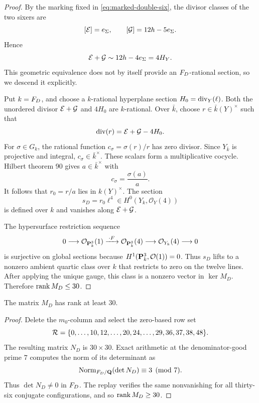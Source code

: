 \begin{proof}
By the marking fixed in \cref{eq:marked-double-six}, the divisor classes of
the two sixers are
\[
 [\mathcal E]=e_\Sigma,\qquad [\mathcal G]=12h-5e_\Sigma.
\]
Hence
\begin{equation}
 \mathcal E+\mathcal G\sim12h-4e_\Sigma=4H_Y.
\label{eq:double-six-class}
\end{equation}
This geometric equivalence does not by itself provide an \(F_D\)-rational
section, so we descend it explicitly.

Put \(k=F_D\), and choose a \(k\)-rational hyperplane section
\(H_0=\operatorname{div}_Y(\ell)\).  Both the unordered divisor \(\mathcal E+\mathcal G\) and \(4H_0\)
are \(k\)-rational.  Over \(\bar k\), choose
\(r\in\bar k(Y)^\times\) such that
\[
 \operatorname{div}(r)=\mathcal E+\mathcal G-4H_0.
\]
For \(\sigma\in G_k\), the rational function
\(c_\sigma=\sigma(r)/r\) has zero divisor.  Since \(Y_{\bar k}\) is
projective and integral, \(c_\sigma\in\bar k^\times\).  These scalars form a
multiplicative cocycle.  Hilbert theorem 90 gives \(a\in\bar k^\times\) with
\[
 c_\sigma=\frac{\sigma(a)}{a}.
\]
It follows that \(r_0=r/a\) lies in \(k(Y)^\times\).  The section
\[
 s_D=r_0\ell^4\in H^0(Y_k,\mathcal O_Y(4))
\]
is defined over \(k\) and vanishes along \(\mathcal E+\mathcal G\).

The hypersurface restriction sequence
\begin{equation}
 0\longrightarrow\mathcal O_{\mathbf P^3_k}(1)
 \xrightarrow{\;\cdot F\;}\mathcal O_{\mathbf P^3_k}(4)
 \longrightarrow\mathcal O_{Y_k}(4)\longrightarrow0
\label{eq:restriction-sequence}
\end{equation}
is surjective on global sections because
\(H^1(\mathbf P^3_k,\mathcal O(1))=0\).  Thus \(s_D\) lifts to a nonzero ambient
quartic class over \(k\) that restricts to zero on the twelve lines.  After
applying the unique gauge, this class is a nonzero vector in \(\ker M_D\).
Therefore \(\operatorname{rank} M_D\le30\).
\end{proof}

\begin{proposition}
\label{prop:rank-lower}
The matrix \(M_D\) has rank at least \(30\).
\end{proposition}

\begin{proof}
Delete the \(m_0\)-column and select the zero-based row set
\begin{equation}
 \mathcal R=\{0,\ldots,10,12,\ldots,20,24,\ldots,29,36,37,38,48\}.
\label{eq:pivot-rows}
\end{equation}
The resulting matrix \(N_D\) is \(30\times30\).  Exact arithmetic at the
denominator-good prime \(7\) computes the norm of its determinant as
\[
 \operatorname{Norm}_{F_D/\mathbf Q}(\det N_D)\equiv3\pmod7.
\]
Thus \(\det N_D\ne0\) in \(F_D\).  The replay verifies the same nonvanishing
for all thirty-six conjugate configurations, and so
\(\operatorname{rank} M_D\ge30\).
\end{proof}


